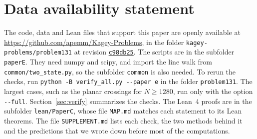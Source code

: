 \documentclass[11pt]{article}
\theoremstyle{definition}
\theoremstyle{remark}
\begin{document}
\section*{Data availability statement}
\sloppy
The code, data and Lean files that support this paper are openly available
at \url{https://github.com/apemm/Kagey-Problems}, in the folder
\nolinkurl{kagey-problems/problem131} at revision
\href{https://github.com/apemm/Kagey-Problems/tree/c98db255026bf21ed3c041a8ed888ed99b734886}{\texttt{c98db25}}. The scripts are in the subfolder
\nolinkurl{paperE}. They need numpy and scipy, and import the line walk from
\nolinkurl{common/two_state.py}, so the subfolder \nolinkurl{common} is also needed. To rerun the
checks, run \texttt{python -B verify\_all.py -{}-paper e} in the folder
\nolinkurl{problem131}. The largest cases, such as the planar crossings for
$N\ge1280$, run only with the option \texttt{-{}-full}.
Section~\ref{sec:verify} summarizes the checks. The Lean~4 proofs are
in the subfolder \nolinkurl{lean/PaperC}, whose file \nolinkurl{MAP.md} matches
each statement to its Lean theorems. The file \nolinkurl{SUPPLEMENT.md} lists
each check, the two methods behind it and the predictions that we wrote down
before most of the computations.\par
\fussy

\appendix

\end{document}
